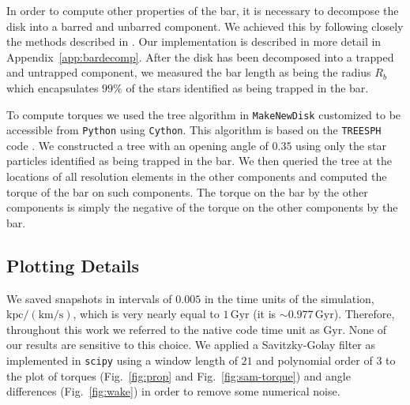 \documentclass[twocolumn,linenumbers,trackchanges]{aastex631}
\begin{document}
In order to compute other properties of the bar, it is necessary to decompose
the disk into a barred and unbarred component. We achieved this by following
closely the methods described in \citet{2016MNRAS.463.1952P}. Our implementation
is described in more detail in Appendix~\ref{app:bardecomp}. After the disk has
been decomposed into a trapped and untrapped component, we measured the bar
length as being the radius $R_b$ which encapsulates $99\%$ of the stars
identified as being trapped in the bar.

To compute torques we used the tree algorithm in \texttt{MakeNewDisk}
\citep{2005MNRAS.361..776S} customized to be accessible from \texttt{Python}
using \texttt{Cython}. This algorithm is based on the \texttt{TREESPH} code
\citep{1989ApJS...70..419H}. We constructed a tree with an opening angle of
$0.35$ using only the star particles identified as being trapped in the bar. We
then queried the tree at the locations of all resolution elements in the other
components and computed the torque of the bar on such components. The torque on
the bar by the other components is simply the negative of the torque on the
other components by the bar.

\subsection{Plotting Details}
We saved snapshots in intervals of $0.005$ in the time units of the simulation,
$\textrm{kpc}/(\textrm{km}/\textrm{s})$, which is very nearly equal to
$1\,\textrm{Gyr}$ (it is $\sim0.977\,\textrm{Gyr}$). Therefore, throughout this
work we referred to the native code time unit as $\textrm{Gyr}$. None of our
results are sensitive to this choice. We applied a Savitzky-Golay filter
\citep{1964AnaCh..36.1627S} as implemented in \texttt{scipy} using a window
length of $21$ and polynomial order of $3$ to the plot of torques
(Fig.~\ref{fig:prop} and Fig.~\ref{fig:sam-torque}) and angle differences
(Fig.~\ref{fig:wake}) in order to remove some numerical noise.
\end{document}
